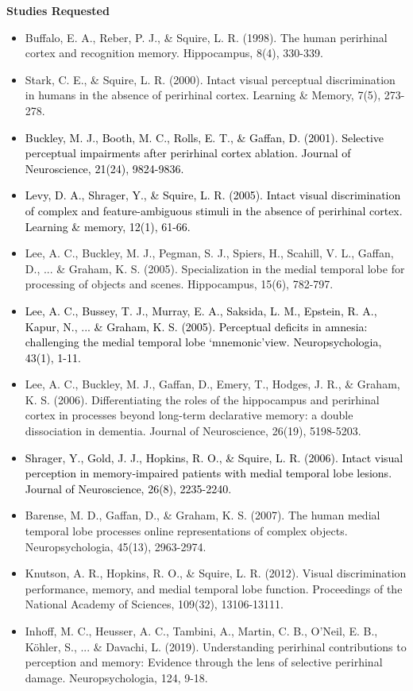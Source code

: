 \documentclass[11pt]{article}
\begin{document}
\vspace{3mm}
\noindent\textbf{Studies Requested}
\begin{itemize}
\itemsep0em 
\renewcommand{\labelitemi}{--}
\item Buffalo, E. A., Reber, P. J., \& Squire, L. R. (1998). The human perirhinal cortex and recognition memory. Hippocampus, 8(4), 330-339.
\item Stark, C. E., \& Squire, L. R. (2000). Intact visual perceptual discrimination in humans in the absence of perirhinal cortex. Learning \& Memory, 7(5), 273-278.
\item \textcolor{black}{Buckley, M. J., Booth, M. C., Rolls, E. T., \& Gaffan, D. (2001). Selective perceptual impairments after perirhinal cortex ablation. Journal of Neuroscience, 21(24), 9824-9836.}
\item \textcolor{black}{Levy, D. A., Shrager, Y., \& Squire, L. R. (2005). Intact visual discrimination of complex and feature-ambiguous stimuli in the absence of perirhinal cortex. Learning \& memory, 12(1), 61-66.}
\item Lee, A. C., Buckley, M. J., Pegman, S. J., Spiers, H., Scahill, V. L., Gaffan, D., ... \& Graham, K. S. (2005). Specialization in the medial temporal lobe for processing of objects and scenes. Hippocampus, 15(6), 782-797.
\item \textcolor{black}{Lee, A. C., Bussey, T. J., Murray, E. A., Saksida, L. M., Epstein, R. A., Kapur, N., ... \& Graham, K. S. (2005). Perceptual deficits in amnesia: challenging the medial temporal lobe ‘mnemonic’view. Neuropsychologia, 43(1), 1-11.}
\item Lee, A. C., Buckley, M. J., Gaffan, D., Emery, T., Hodges, J. R., \& Graham, K. S. (2006). Differentiating the roles of the hippocampus and perirhinal cortex in processes beyond long-term declarative memory: a double dissociation in dementia. Journal of Neuroscience, 26(19), 5198-5203.
\item \textcolor{black}{Shrager, Y., Gold, J. J., Hopkins, R. O., \& Squire, L. R. (2006). Intact visual perception in memory-impaired patients with medial temporal lobe lesions. Journal of Neuroscience, 26(8), 2235-2240.}
\item Barense, M. D., Gaffan, D., \& Graham, K. S. (2007). The human medial temporal lobe processes online representations of complex objects. Neuropsychologia, 45(13), 2963-2974.
\item Knutson, A. R., Hopkins, R. O., \& Squire, L. R. (2012). Visual discrimination performance, memory, and medial temporal lobe function. Proceedings of the National Academy of Sciences, 109(32), 13106-13111.
\item Inhoff, M. C., Heusser, A. C., Tambini, A., Martin, C. B., O’Neil, E. B., Köhler, S., ... \& Davachi, L. (2019). Understanding perirhinal contributions to perception and memory: Evidence through the lens of selective perirhinal damage. Neuropsychologia, 124, 9-18.
\end{itemize}
\end{document}

